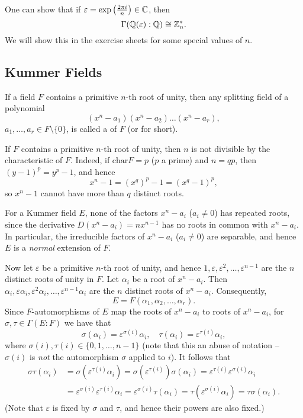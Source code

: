 \begin{remark}
	One can show that if $\varepsilon = \exp\left(\frac{2\pi i}{n}\right) \in \mathbb{C}$, then
	\[
		\Gamma(\mathbb{Q}(\varepsilon) : \mathbb{Q}) \cong \mathbb{Z}_n^*.
	\]
	We will show this in the exercise sheets for some special values of $n$.
\end{remark}

\subsection{Kummer Fields}
If a field $F$ contains a primitive $n$-th root of unity, then any splitting field of a polynomial
\[
	(x^n - a_1)(x^n - a_2)\dots(x^n - a_r),
\]
$a_1, \dots, a_r \in F \setminus \{0\}$, is called a  of $F$ (or  for short).

\begin{remark}
	If $F$ contains a primitive $n$-th root of unity, then $n$ is not divisible by the characteristic of $F$. Indeed, if $\text{char}{F} = p$ ($p$ a prime) and $n = qp$, then $(y - 1)^p = y^p - 1$, and hence
	\[
		x^n - 1 = (x^q)^p - 1 = (x^q - 1)^p,
	\]
	so $x^n - 1$ cannot have more than $q$ distinct roots.
\end{remark}

For a Kummer field $E$, none of the factors $x^n - a_i$ ($a_i \neq 0$) has repeated roots, since the derivative $D(x^n - a_i) = nx^{n - 1}$ has no roots in common with $x^n - a_i$. In particular, the irreducible factors of $x^n - a_i$ ($a_i \neq 0$) are separable, and hence $E$ is a \emph{normal} extension of $F$.

Now let $\varepsilon$ be a primitive $n$-th root of unity, and hence $1, \varepsilon, \varepsilon^2, \dots, \varepsilon^{n - 1}$ are the $n$ distinct roots of unity in $F$. Let $\alpha_i$ be a root of $x^n - a_i$. Then $\alpha_i, \varepsilon\alpha_i, \varepsilon^2 \alpha_i, \dots, \varepsilon^{n - 1} \alpha_i$ are the $n$ distinct roots of $x^n - a_i$. Consequently,
\[
	E = F(\alpha_1, \alpha_2, \dots, \alpha_r).
\]
Since $F$-automorphisms of $E$ map the roots of $x^n - a_i$ to roots of $x^n - a_i$, for $\sigma, \tau \in \Gamma(E : F)$ we have that
\[
	\sigma(\alpha_i) = \varepsilon^{\sigma(i)} \alpha_i, \quad \tau(\alpha_i) = \varepsilon^{\tau(i)} \alpha_i,
\]
where $\sigma(i), \tau(i) \in \{0, 1, \dots, n - 1\}$ (note that this an abuse of notation -- $\sigma(i)$ is \emph{not} the automorphism $\sigma$ applied to $i$). It follows that
\begin{align*}
	\sigma\tau(\alpha_i) &= \sigma(\varepsilon^{\tau(i)} \alpha_i) = \sigma(\varepsilon^{\tau(i)}) \sigma(\alpha_i) = \varepsilon^{\tau(i)} \varepsilon^{\sigma(i)} \alpha_i \\
		&= \varepsilon^{\sigma(i)} \varepsilon^{\tau(i)} \alpha_i = \varepsilon^{\sigma(i)} \tau(\alpha_i) = \tau(\varepsilon^{\sigma(i)} \alpha_i) = \tau\sigma(\alpha_i).
\end{align*}
(Note that $\varepsilon$ is fixed by $\sigma$ and $\tau$, and hence their powers are also fixed.)

